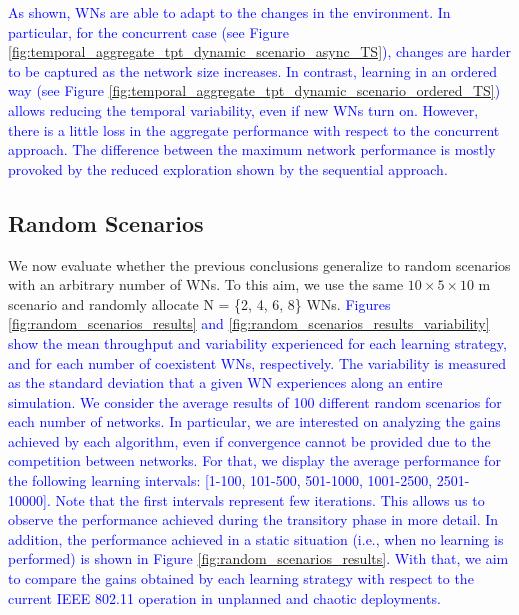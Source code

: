 \documentclass[preprint,12pt]{elsarticle}
\begin{document}
	\textcolor{blue}{As shown, WNs are able to adapt to the changes in the environment. In particular, for the concurrent case (see Figure \ref{fig:temporal_aggregate_tpt_dynamic_scenario_async_TS}), changes are harder to be captured as the network size increases. In contrast, learning in an ordered way (see Figure \ref{fig:temporal_aggregate_tpt_dynamic_scenario_ordered_TS}) allows reducing the temporal variability, even if new WNs turn on. However, there is a little loss in the aggregate performance with respect to the concurrent approach. The difference between the maximum network performance is mostly provoked by the reduced exploration shown by the sequential approach.}
	\subsection{Random Scenarios}
	\label{section:random}
	
	We now evaluate whether the previous conclusions generalize to random scenarios with an arbitrary number of WNs. To this aim, we use the same $10\times5\times 10$ m scenario and randomly allocate N = \{2, 4, 6, 8\} WNs. \textcolor{blue}{Figures \ref{fig:random_scenarios_results} and \ref{fig:random_scenarios_results_variability} show the mean throughput and variability experienced for each learning strategy, and for each number of coexistent WNs, respectively. The variability is measured as the standard deviation that a given WN experiences along an entire simulation. We consider the average results of 100 different random scenarios for each number of networks. In particular, we are interested on analyzing the gains achieved by each algorithm, even if convergence cannot be provided due to the competition between networks. For that, we display the average performance for the following learning intervals: [1-100, 101-500, 501-1000, 1001-2500, 2501-10000]. Note that the first intervals represent few iterations. This allows us to observe the performance achieved during the transitory phase in more detail. In addition, the performance achieved in a static situation (i.e., when no learning is performed) is shown in Figure \ref{fig:random_scenarios_results}. With that, we aim to compare the gains obtained by each learning strategy with respect to the current IEEE 802.11 operation in unplanned and chaotic deployments.}
	
\end{document}
